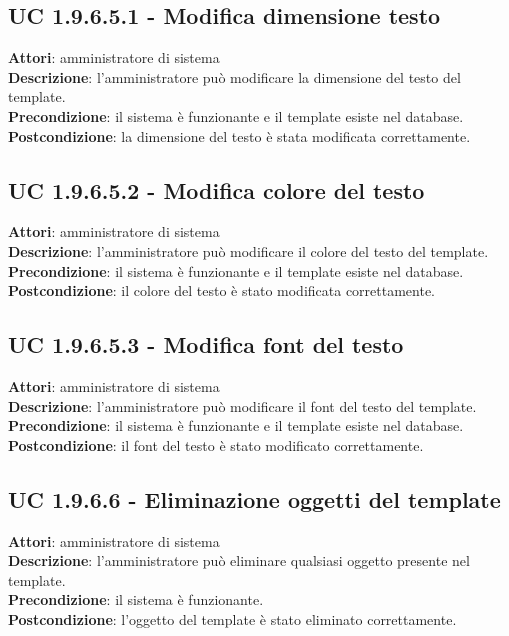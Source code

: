 \subsection{UC 1.9.6.5.1 - Modifica dimensione testo}{
	\label{uc1.9.6.5.1}
	\textbf{Attori}: amministratore di sistema \\
	\textbf{Descrizione}: l'amministratore può modificare la dimensione del testo del template. \\
	\textbf{Precondizione}: il sistema è funzionante e il template esiste nel database.	\\
	\textbf{Postcondizione}: la dimensione del testo è stata modificata correttamente.	\\
	}
\subsection{UC 1.9.6.5.2 - Modifica colore del testo}{
	\label{uc1.9.6.5.2}
	\textbf{Attori}: amministratore di sistema \\
	\textbf{Descrizione}: l'amministratore può modificare il colore del testo del template. \\
	\textbf{Precondizione}: il sistema è funzionante e il template esiste nel database.	\\
	\textbf{Postcondizione}: il colore del testo è stato modificata correttamente.	\\
	}
\subsection{UC 1.9.6.5.3 - Modifica font del testo}{
	\label{uc1.9.6.5.3}
	\textbf{Attori}: amministratore di sistema \\
	\textbf{Descrizione}: l'amministratore può modificare il font  del testo del template. \\
	\textbf{Precondizione}: il sistema è funzionante e il template esiste nel database.	\\
	\textbf{Postcondizione}: il font del testo è stato modificato correttamente.	\\
	}
\subsection{UC 1.9.6.6 - Eliminazione oggetti del template}{
	\label{uc1.9.6.6}
	\textbf{Attori}: amministratore di sistema \\
	\textbf{Descrizione}: l'amministratore può eliminare qualsiasi oggetto presente nel template. \\
	\textbf{Precondizione}: il sistema è funzionante.	\\
	\textbf{Postcondizione}: l'oggetto del template è stato eliminato correttamente.	\\
	}
